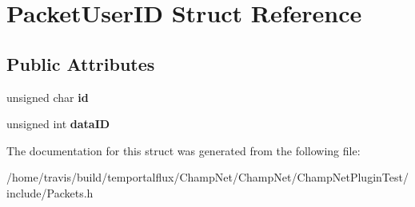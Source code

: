 \hypertarget{struct_packet_user_i_d}{\section{Packet\-User\-I\-D Struct Reference}
\label{struct_packet_user_i_d}
}
\subsection*{Public Attributes}
\begin{DoxyCompactItemize}
\item 
\hypertarget{struct_packet_user_i_d_a1576d84ee490095dbc4bc61767c2380c}{unsigned char {\bfseries id}}\label{struct_packet_user_i_d_a1576d84ee490095dbc4bc61767c2380c}

\item 
\hypertarget{struct_packet_user_i_d_a03b964528b57e0006c42e8e079083407}{unsigned int {\bfseries data\-I\-D}}\label{struct_packet_user_i_d_a03b964528b57e0006c42e8e079083407}

\end{DoxyCompactItemize}


The documentation for this struct was generated from the following file\-:\begin{DoxyCompactItemize}
\item 
/home/travis/build/temportalflux/\-Champ\-Net/\-Champ\-Net/\-Champ\-Net\-Plugin\-Test/include/Packets.\-h\end{DoxyCompactItemize}
